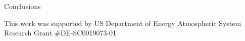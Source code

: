 \documentclass[final]{beamer}
\newlength{\sepwid}
\newlength{\onecolwid}
\begin{document}
\begin{frame}[t]
\begin{columns}[t]
\begin{column}{\onecolwid}
\begin{block}{Conclusions}
		
		\small{This work was supported by US Department of Energy Atmospheric System Research Grant \#DE-SC0019073-01}
	\end{block}

\end{column}
\begin{column}{\sepwid}\end{column} %

\end{columns} %

\end{frame} %
\end{document}
